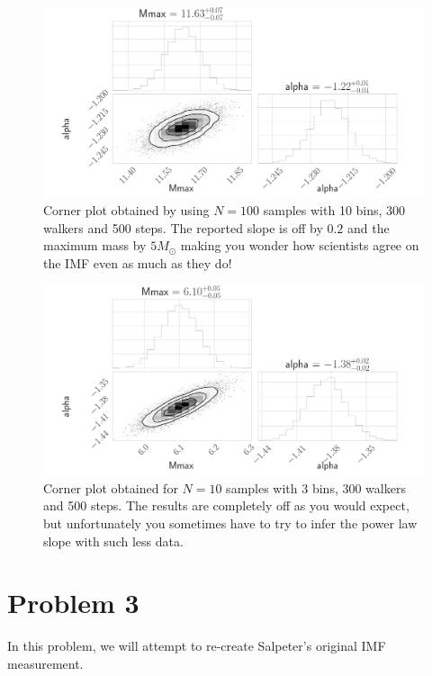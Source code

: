 \documentclass[12pt,usletter,english]{article}
\begin{document}
\begin{figure}[!h]
  \centering \includegraphics[width=13cm]{theta_1e2.png}
  \caption{Corner plot obtained by using $N=100$ samples with 10 bins,
    300 walkers and 500 steps. The reported slope is off by $0.2$ and
    the maximum mass by $5M_{\odot}$ making you wonder how scientists
    agree on the IMF even as much as they do!
    \label{fig:corner_1e2}}
\end{figure}

\begin{figure}[!h]
  \centering \includegraphics[width=13cm]{theta_1e1.png}
  \caption{Corner plot obtained for $N=10$ samples with 3 bins, 300
    walkers and 500 steps. The results are completely off as you would
    expect, but unfortunately you sometimes have to try to infer the
    power law slope with such less data. 
    \label{fig:corner_1e1}}
\end{figure}


\section{Problem 3}

In this problem, we will attempt to re-create Salpeter's original IMF
measurement.  \\
\end{document}
